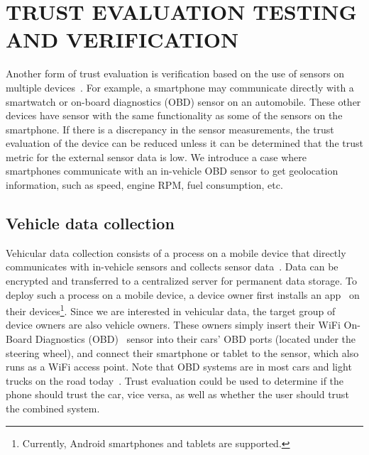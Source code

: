\section{TRUST EVALUATION TESTING AND VERIFICATION}
\label{sec:geolocation}
Another form of trust evaluation is verification based on the use of sensors on multiple devices~\cite{ju2012neteye}.  For example,
a smartphone may communicate directly with a smartwatch or on-board diagnostics (OBD)
sensor on an automobile.  These other devices have sensor with the same
functionality as some of the sensors on the smartphone.  If there is a discrepancy in the sensor measurements, 
the trust evaluation of the device can be reduced unless it can be determined that the trust metric for the 
external sensor data is low.
We introduce a case where smartphones communicate with an in-vehicle OBD sensor
to get geolocation information, such as speed, engine RPM, fuel consumption, 
etc.

\subsection{Vehicle data collection}

Vehicular data collection consists of a process on a mobile 
device that directly communicates with in-vehicle sensors and collects sensor 
data~\cite{sensor}. Data can be encrypted and transferred to a
centralized server for permanent data storage. 
To deploy such a process on a mobile device, a device owner first installs an
app~\cite{sensor-app} on their devices\footnote{Currently, Android smartphones 
and tablets are supported.}. Since we are interested in
vehicular data, the target group of device owners are also vehicle 
owners. These owners simply insert their WiFi On-Board Diagnostics 
(OBD)~\cite{obd} sensor into their cars' OBD ports (located under the steering wheel),  
and connect their 
smartphone or tablet to the sensor, which also runs as a WiFi access 
point. Note that OBD systems are in most cars and light trucks 
on the road today~\cite{obdconnector}. 
Trust evaluation could be used to determine if the phone should trust the car,
vice versa, as well as whether the user should trust the combined system.

